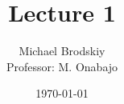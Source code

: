 


\title{Lecture 1}
\date{\today}
\author{Michael Brodskiy\\ \small Professor: M. Onabajo}



\maketitle

